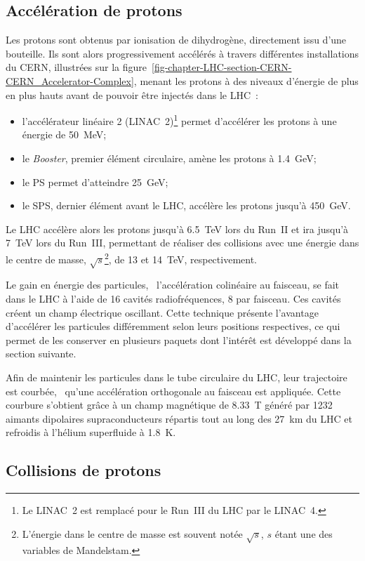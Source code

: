 \subsection{Accélération de protons}\label{chapter-LHC-section-LHC-subsec-pp_acceleration}
Les protons sont obtenus par ionisation de dihydrogène, directement issu d'une bouteille.
Ils sont alors progressivement accélérés à travers différentes installations du CERN, illustrées sur la figure~\ref{fig-chapter-LHC-section-CERN-CERN_Accelerator-Complex}, menant les protons à des niveaux d'énergie de plus en plus hauts avant de pouvoir être injectés dans le LHC~\cite{LHC_paper3}:
\begin{itemize}
\item l'accélérateur linéaire 2 (LINAC~2)\footnote{Le LINAC~2 est remplacé pour le Run~III du LHC par le LINAC~4.} permet d'accélérer les protons à une énergie de \SI{50}{\MeV};
\item le \emph{Booster}, premier élément circulaire, amène les protons à \SI{1.4}{\GeV};
\item le PS permet d'atteindre \SI{25}{\GeV};
\item le SPS, dernier élément avant le LHC, accélère les protons jusqu'à \SI{450}{\GeV}.
\end{itemize}
Le LHC accélère alors les protons jusqu'à \SI{6.5}{\TeV} lors du Run~II et ira jusqu'à \SI{7}{\TeV} lors du Run~III, permettant de réaliser des collisions avec une énergie dans le centre de masse, $\sqrt{s}$\footnote{L'énergie dans le centre de masse est souvent notée $\sqrt{s}$, $s$ étant une des variables de Mandelstam.}, de \num{13} et \SI{14}{\TeV}, respectivement.
\par Le gain en énergie des particules, \ie\ l'accélération colinéaire au faisceau, se fait dans le LHC à l'aide de 16 cavités radiofréquences, 8 par faisceau.
Ces cavités créent un champ électrique oscillant.
Cette technique présente l'avantage d'accélérer les particules différemment selon leurs positions respectives, ce qui permet de les conserver en plusieurs paquets dont l'intérêt est développé dans la section suivante.
\par Afin de maintenir les particules dans le tube circulaire du LHC, leur trajectoire est courbée, \ie\ qu'une accélération orthogonale au faisceau est appliquée.
Cette courbure s'obtient grâce à un champ magnétique de \SI{8.33}{\tesla} généré par 1232 aimants dipolaires supraconducteurs répartis tout au long des \SI{27}{\kilo\meter} du LHC et refroidis à l'hélium superfluide à \SI{1.8}{\kelvin}.
\subsection{Collisions de protons}\label{chapter-LHC-section-LHC-subsec-pp_collisions}
